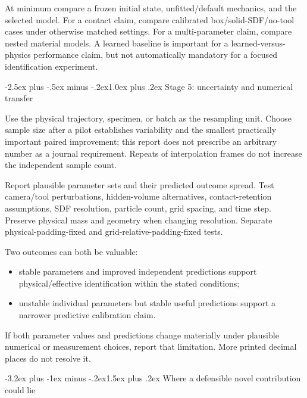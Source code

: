 \documentclass[
  11pt,
]{article}
\makeatletter
\providecommand{\tightlist}{%
  \setlength{\itemsep}{0pt}\setlength{\parskip}{0pt}}
\renewcommand\section{\needspace{7\baselineskip}\@startsection{section}{1}{\z@}%
  {-3.2ex plus -1ex minus -.2ex}{1.5ex plus .2ex}%
  {\normalfont\sffamily\Large\bfseries\color{accent}}}
\renewcommand\subsection{\needspace{5\baselineskip}\@startsection{subsection}{2}{\z@}%
  {-2.5ex plus -.5ex minus -.2ex}{1.0ex plus .2ex}%
  {\normalfont\sffamily\large\bfseries\color{accent}}}
\makeatother
\begin{document}
At minimum compare a frozen initial state, unfitted/default mechanics,
and the selected model. For a contact claim, compare calibrated
box/solid-SDF/no-tool cases under otherwise matched settings. For a
multi-parameter claim, compare nested material models. A learned
baseline is important for a learned-versus-physics performance claim,
but not automatically mandatory for a focused identification experiment.

\subsection{Stage 5: uncertainty and numerical
transfer}\label{stage-5-uncertainty-and-numerical-transfer}

Use the physical trajectory, specimen, or batch as the resampling unit.
Choose sample size after a pilot establishes variability and the
smallest practically important paired improvement; this report does not
prescribe an arbitrary number as a journal requirement. Repeats of
interpolation frames do not increase the independent sample count.

Report plausible parameter sets and their predicted outcome spread. Test
camera/tool perturbations, hidden-volume alternatives, contact-retention
assumptions, SDF resolution, particle count, grid spacing, and time
step. Preserve physical mass and geometry when changing resolution.
Separate physical-padding-fixed and grid-relative-padding-fixed tests.

Two outcomes can both be valuable:

\begin{itemize}
\tightlist
\item
  stable parameters and improved independent predictions support
  physical/effective identification within the stated conditions;
\item
  unstable individual parameters but stable useful predictions support a
  narrower predictive calibration claim.
\end{itemize}

If both parameter values and predictions change materially under
plausible numerical or measurement choices, report that limitation. More
printed decimal places do not resolve it.

\section{Where a defensible novel contribution could
lie}\label{where-a-defensible-novel-contribution-could-lie}
\end{document}
